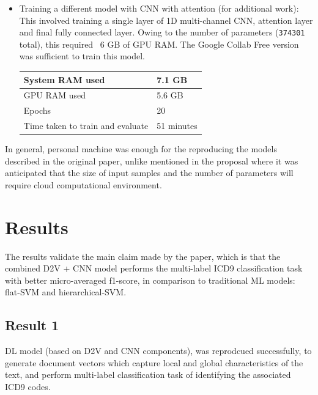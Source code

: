 \documentclass[11pt,a4paper]{article}
\begin{document}
\begin{itemize}
	\item Training a different model with CNN with attention (for additional work): This involved training a single layer of 1D multi-channel CNN, attention layer and final fully connected layer. Owing to the number of parameters (\texttt{374301} total), this required ~6 GB of GPU RAM. The Google Collab Free version was sufficient to train this model.
\newline

\begin{small}
\begin{tabular}{ ll }
	\hline
   		System RAM used & 7.1 GB \\
  	\hline
    		GPU RAM used & 5.6 GB \\
  	\hline
  		Epochs & 20 \\
  	\hline
  		Time taken to train and evaluate & 51 minutes \\
  	\hline
\end{tabular}
\end{small}
\newline	
	
\end{itemize}


In general, personal machine was enough for the reproducing the models described in the original paper, unlike mentioned in the proposal where it was anticipated that the size of input samples and the number of parameters will require cloud computational environment.

\section{Results}

The results validate the main claim made by the paper, which is that the combined D2V + CNN model performs the multi-label ICD9 classification task with better micro-averaged f1-score, in comparison to traditional ML models: flat-SVM and hierarchical-SVM.

\subsection{Result 1}

DL model (based on D2V and CNN components), was reprodcued successfully, to generate document vectors which capture local and global characteristics of the text, and perform multi-label classification task of identifying the associated ICD9 codes.
\newline
\end{document}
